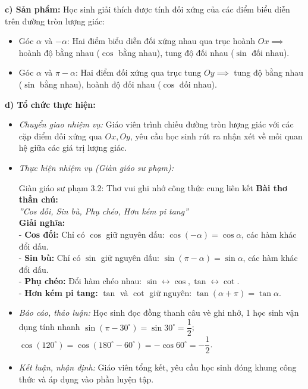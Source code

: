 \documentclass[12pt, a4paper]{article}
\begin{document}
\textbf{c) Sản phẩm:} Học sinh giải thích được tính đối xứng của các điểm biểu diễn trên đường tròn lượng giác:
\begin{itemize}[leftmargin=0.6cm]
    \item Góc $\alpha$ và $-\alpha$: Hai điểm biểu diễn đối xứng nhau qua trục hoành $Ox \implies$ hoành độ bằng nhau ($\cos$ bằng nhau), tung độ đối nhau ($\sin$ đối nhau).
    \item Góc $\alpha$ và $\pi - \alpha$: Hai điểm đối xứng qua trục tung $Oy \implies$ tung độ bằng nhau ($\sin$ bằng nhau), hoành độ đối nhau ($\cos$ đối nhau).
\end{itemize}

\textbf{d) Tổ chức thực hiện:}
\begin{itemize}[leftmargin=0.6cm]
    \item \textit{Chuyển giao nhiệm vụ:} Giáo viên trình chiếu đường tròn lượng giác với các cặp điểm đối xứng qua $Ox, Oy$, yêu cầu học sinh rút ra nhận xét về mối quan hệ giữa các giá trị lượng giác.
    \item \textit{Thực hiện nhiệm vụ (Giàn giáo sư phạm):}
    \begin{scaffoldbox}{Giàn giáo sư phạm 3.2: Thơ vui ghi nhớ công thức cung liên kết}
        \textbf{Bài thơ thần chú:}\\
        \textit{''Cos đối, Sin bù, Phụ chéo, Hơn kém pi tang''}\\
        \textbf{Giải nghĩa:}\\
        - \textbf{Cos đối:} Chỉ có $\cos$ giữ nguyên dấu: $\cos(-\alpha) = \cos\alpha$, các hàm khác đổi dấu.\\
        - \textbf{Sin bù:} Chỉ có $\sin$ giữ nguyên dấu: $\sin(\pi - \alpha) = \sin\alpha$, các hàm khác đổi dấu.\\
        - \textbf{Phụ chéo:} Đổi hàm chéo nhau: $\sin \leftrightarrow \cos, \tan \leftrightarrow \cot$.\\
        - \textbf{Hơn kém pi tang:} $\tan$ và $\cot$ giữ nguyên: $\tan(\alpha + \pi) = \tan\alpha$.
    \end{scaffoldbox}
    \item \textit{Báo cáo, thảo luận:} Học sinh đọc đồng thanh câu vè ghi nhớ, 1 học sinh vận dụng tính nhanh $\sin(\pi - 30^\circ) = \sin 30^\circ = \dfrac{1}{2}$; $\cos(120^\circ) = \cos(180^\circ - 60^\circ) = -\cos 60^\circ = -\dfrac{1}{2}$.
    \item \textit{Kết luận, nhận định:} Giáo viên tổng kết, yêu cầu học sinh đóng khung công thức và áp dụng vào phần luyện tập.
\end{itemize}
\end{document}
